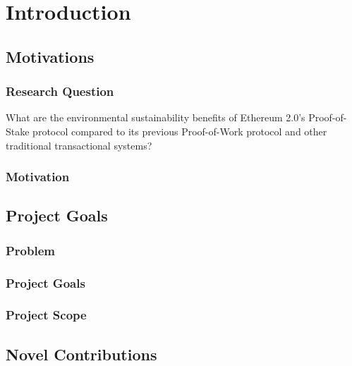 \chapter{Introduction}

\section{Motivations}

\subsection{Research Question}

What are the environmental sustainability benefits of Ethereum 2.0's Proof-of-Stake protocol compared to its previous Proof-of-Work protocol and other traditional transactional systems?

\subsection{Motivation}

\section{Project Goals}
\subsection{Problem}
\subsection{Project Goals}
\subsection{Project Scope}

\section{Novel Contributions}